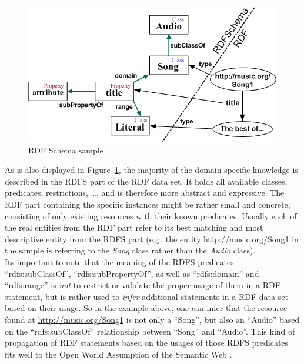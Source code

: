 \begin{figure}[H]
	\centering
	\includegraphics[width=0.9\columnwidth]{images/RDFSchema.png}
	\caption[RDF Schema sample]{RDF Schema sample \citep{RobertoSemWeb}}
	\label{fig:images_rdfs_sample}
\end{figure}

As is also displayed in Figure~\ref{fig:images_rdfs_sample}, the majority of the domain specific knowledge is described in the \gls{RDFS} part of the \gls{RDF} data set. It holds all available classes, predicates, restrictions, \ldots, and is therefore more abstract and expressive. The \gls{RDF} part containing the specific instances might be rather small and concrete, consisting of only existing resources with their known predicates. Usually each of the real entities from the \gls{RDF} part refer to its best matching and most descriptive entity from the \gls{RDFS} part (e.g.\ the entity \url{http://music.org/Song1} in the sample is referring to the \emph{Song} class rather than the \emph{Audio} class). \\

Its important to note that the meaning of the \gls{RDFS} predicates ``rdfs:subClassOf'', ``rdfs:subPropertyOf'', as well as ``rdfs:domain'' and ``rdfs:range'' is \emph{not} to restrict or validate the proper usage of them in a \gls{RDF} statement, but is rather used to \emph{infer} additional statements in a \gls{RDF} data set based on their usage. So in the example above, one can infer that the resource found at \url{http://music.org/Song1} is not only a ``Song'', but also an ``Audio'' based on the ``rdfs:subClassOf'' relationship between ``Song'' and ``Audio''. This kind of propagation of \gls{RDF} statements based on the usages of those \gls{RDFS} predicates fits well to the Open World Assumption of the Semantic Web \citep[pg. 125-152]{allemang2011semantic}. \\

